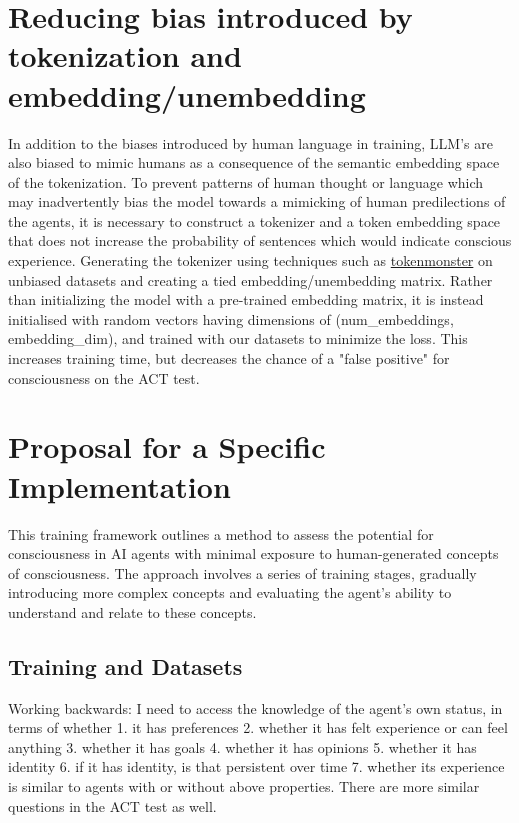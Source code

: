 \documentclass{article}
\begin{document}
\section{Reducing bias introduced by tokenization and embedding/unembedding}

In addition to the biases introduced by human language in training, LLM's are also biased to mimic humans as a consequence of the semantic embedding space of the tokenization. To prevent patterns of human thought or language which may inadvertently bias the model towards a mimicking of human predilections of the  agents, it is necessary to construct a tokenizer and a token embedding space that does not increase the probability of sentences which would indicate conscious experience. Generating the tokenizer using techniques such as \href{https://github.com/alasdairforsythe/tokenmonster}{tokenmonster} on unbiased datasets and creating a tied embedding/unembedding matrix. Rather than initializing the model with a pre-trained embedding matrix, it is instead initialised with random vectors having dimensions of (num\_embeddings, embedding\_dim), and trained with our datasets to minimize the loss. This increases training time, but decreases the chance of a "false positive" for consciousness on the ACT test. 


\section{Proposal for a Specific Implementation}

This training framework outlines a method to assess the potential for consciousness in AI agents with minimal exposure to human-generated concepts of consciousness. The approach involves a series of training stages, gradually introducing more complex concepts and evaluating the agent's ability to understand and relate to these concepts. 

\subsection{Training and Datasets}

Working backwards: I need to access the knowledge of the agent's own status, in terms of whether 1. it has preferences 2. whether it has felt experience or can feel anything 3. whether it has goals 4. whether it has opinions 5. whether it has identity 6. if it has identity, is that persistent over time 7. whether its experience is similar to agents with or without above properties. There are more similar questions in the ACT test as well.
\end{document}
